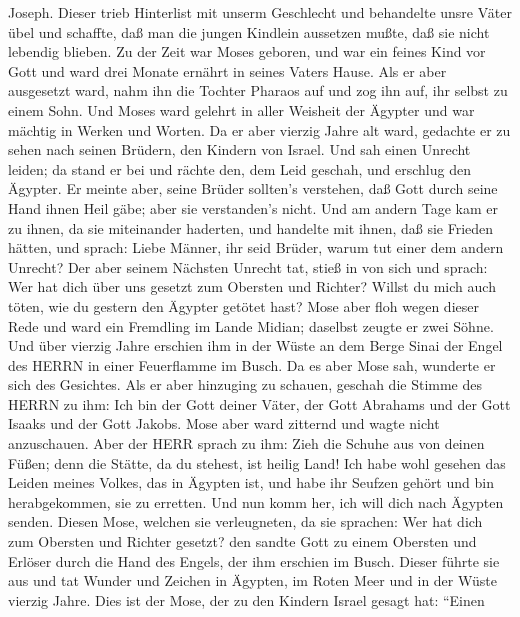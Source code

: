 Joseph.  Dieser trieb Hinterlist mit unserm Geschlecht und
behandelte unsre Väter übel und schaffte, daß man die jungen Kindlein
aussetzen mußte, daß sie nicht lebendig blieben.  Zu der
Zeit war Moses geboren, und war ein feines Kind vor Gott und ward drei
Monate ernährt in seines Vaters Hause.  Als er aber
ausgesetzt ward, nahm ihn die Tochter Pharaos auf und zog ihn auf, ihr
selbst zu einem Sohn.  Und Moses ward gelehrt in aller
Weisheit der Ägypter und war mächtig in Werken und Worten. 
Da er aber vierzig Jahre alt ward, gedachte er zu sehen nach seinen
Brüdern, den Kindern von Israel.  Und sah einen Unrecht
leiden; da stand er bei und rächte den, dem Leid geschah, und erschlug
den Ägypter.  Er meinte aber, seine Brüder sollten's
verstehen, daß Gott durch seine Hand ihnen Heil gäbe; aber sie
verstanden's nicht.  Und am andern Tage kam er zu ihnen, da
sie miteinander haderten, und handelte mit ihnen, daß sie Frieden
hätten, und sprach: Liebe Männer, ihr seid Brüder, warum tut einer dem
andern Unrecht?  Der aber seinem Nächsten Unrecht tat,
stieß in von sich und sprach: Wer hat dich über uns gesetzt zum Obersten
und Richter?  Willst du mich auch töten, wie du gestern den
Ägypter getötet hast?  Mose aber floh wegen dieser Rede und
ward ein Fremdling im Lande Midian; daselbst zeugte er zwei Söhne.
 Und über vierzig Jahre erschien ihm in der Wüste an dem
Berge Sinai der Engel des HERRN in einer Feuerflamme im Busch.
 Da es aber Mose sah, wunderte er sich des Gesichtes. Als
er aber hinzuging zu schauen, geschah die Stimme des HERRN zu ihm:
 Ich bin der Gott deiner Väter, der Gott Abrahams und der
Gott Isaaks und der Gott Jakobs. Mose aber ward zitternd und wagte nicht
anzuschauen.  Aber der HERR sprach zu ihm: Zieh die Schuhe
aus von deinen Füßen; denn die Stätte, da du stehest, ist heilig Land!
 Ich habe wohl gesehen das Leiden meines Volkes, das in
Ägypten ist, und habe ihr Seufzen gehört und bin herabgekommen, sie zu
erretten. Und nun komm her, ich will dich nach Ägypten senden.
 Diesen Mose, welchen sie verleugneten, da sie sprachen:
Wer hat dich zum Obersten und Richter gesetzt? den sandte Gott zu einem
Obersten und Erlöser durch die Hand des Engels, der ihm erschien im
Busch.  Dieser führte sie aus und tat Wunder und Zeichen in
Ägypten, im Roten Meer und in der Wüste vierzig Jahre. 
Dies ist der Mose, der zu den Kindern Israel gesagt hat: ``Einen
